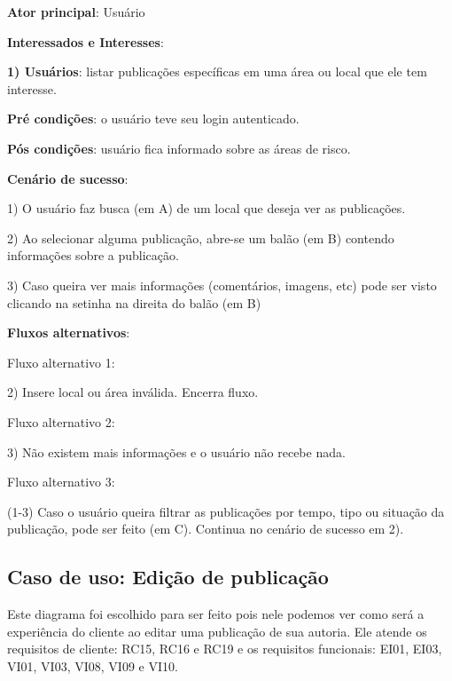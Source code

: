 \documentclass[12pt]{article}
\begin{document}
\textbf{Ator principal}: Usuário

\textbf{Interessados e Interesses}:

\textbf{1) Usuários}: listar publicações específicas em uma área ou local que ele tem interesse.

\textbf{Pré condições}: o usuário teve seu login autenticado.

\textbf{Pós condições}: usuário fica informado sobre as áreas de risco.

\textbf{Cenário de sucesso}:

1) O usuário faz busca (em A) de um local que deseja ver as publicações.

2) Ao selecionar alguma publicação, abre-se um balão (em B) contendo informações sobre a publicação.

3) Caso queira ver mais informações (comentários, imagens, etc) pode ser visto clicando na setinha na direita do balão (em B)


\textbf{Fluxos alternativos}:

Fluxo alternativo 1:

2) Insere local ou área inválida. Encerra fluxo.

Fluxo alternativo 2:

3) Não existem mais informações e o usuário não recebe nada.

Fluxo alternativo 3:

(1-3) Caso o usuário queira filtrar as publicações por tempo, tipo ou situação da publicação, pode ser feito (em C). Continua no cenário de sucesso em 2).

\vfill%
\pagebreak%

\subsection{Caso de uso: Edição de publicação}
Este diagrama foi escolhido para ser feito pois nele podemos ver como será a experiência do cliente ao editar uma publicação de sua autoria. Ele atende os requisitos de cliente: RC15, RC16 e RC19 e os requisitos funcionais: EI01, EI03, VI01, VI03, VI08, VI09 e VI10.
\end{document}
